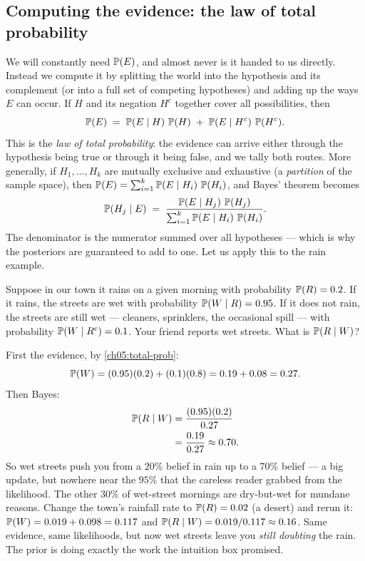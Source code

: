 \subsection{Computing the evidence: the law of total probability}

We will constantly need $\P(E)$, and almost never is it handed to us directly. Instead
we compute it by splitting the world into the hypothesis and its complement (or into a
full set of competing hypotheses) and adding up the ways $E$ can occur. If $H$ and its
negation $H^c$ together cover all possibilities, then
\begin{equation}
  \P(E) \;=\; \P(E \given H)\,\P(H) \;+\; \P(E \given H^c)\,\P(H^c).
  \label{ch05:total-prob}
\end{equation}
This is the \emph{law of total probability}: the evidence can arrive either through the
hypothesis being true or through it being false, and we tally both routes. More
generally, if $H_1, \dots, H_k$ are mutually exclusive and exhaustive (a \emph{partition}
of the sample space), then $\P(E) = \sum_{i=1}^{k} \P(E \given H_i)\,\P(H_i)$, and Bayes'
theorem becomes
\begin{equation}
  \P(H_j \given E) \;=\; \frac{\P(E \given H_j)\,\P(H_j)}
                              {\sum_{i=1}^{k} \P(E \given H_i)\,\P(H_i)}.
  \label{ch05:bayes-partition}
\end{equation}
The denominator is the numerator summed over all hypotheses --- which is why the
posteriors are guaranteed to add to one. Let us apply this to the rain example.

\begin{example}
\label{ch05:ex-rain}
Suppose in our town it rains on a given morning with probability $\P(R) = 0.2$. If it
rains, the streets are wet with probability $\P(W \given R) = 0.95$. If it does not rain,
the streets are still wet --- cleaners, sprinklers, the occasional spill --- with
probability $\P(W \given R^c) = 0.1$. Your friend reports wet streets. What is
$\P(R \given W)$?

First the evidence, by \eqref{ch05:total-prob}:
\[
  \P(W) = (0.95)(0.2) + (0.1)(0.8) = 0.19 + 0.08 = 0.27.
\]
Then Bayes:
\begin{align*}
  \P(R \given W) &= \frac{(0.95)(0.2)}{0.27} \\
                 &= \frac{0.19}{0.27} \approx 0.70.
\end{align*}
So wet streets push you from a $20\%$ belief in rain up to a $70\%$ belief --- a big
update, but nowhere near the $95\%$ that the careless reader grabbed from the likelihood.
The other $30\%$ of wet-street mornings are dry-but-wet for mundane reasons. Change the
town's rainfall rate to $\P(R)=0.02$ (a desert) and rerun it: $\P(W) = 0.019 + 0.098 =
0.117$ and $\P(R\given W) = 0.019/0.117 \approx 0.16$. Same evidence, same likelihoods,
but now wet streets leave you \emph{still doubting} the rain. The prior is doing exactly
the work the intuition box promised.
\end{example}

